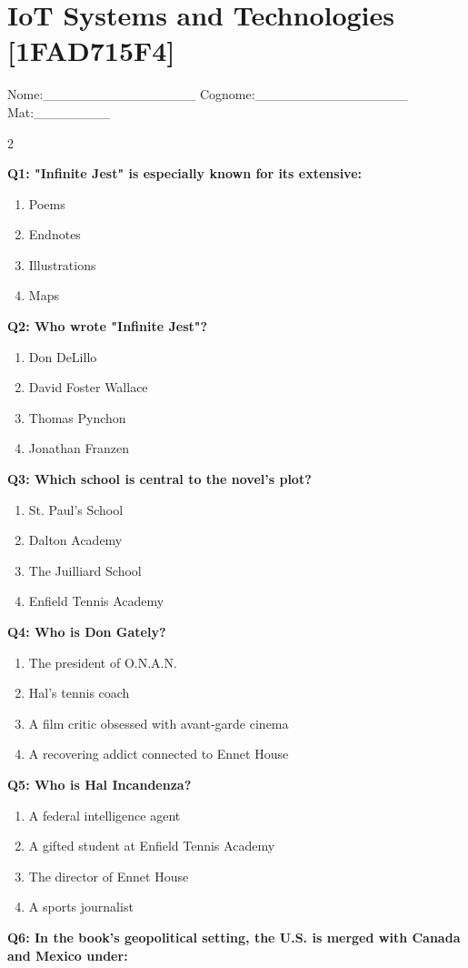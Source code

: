 \documentclass[10pt]{article}
\begin{document}
\section*{IoT Systems and Technologies \footnotesize [1FAD715F4]}
{\footnotesize Nome:\_\_\_\_\_\_\_\_\_\_\_\_\_\_\_\_ Cognome:\_\_\_\_\_\_\_\_\_\_\_\_\_\_\_\_ Mat:\_\_\_\_\_\_\_\_}
\begin{multicols}{2}

\textbf{Q1: "Infinite Jest" is especially known for its extensive:}

\begin{enumerate}[label=\arabic*.]
\item Poems
\item Endnotes
\item Illustrations
\item Maps
\end{enumerate}
\textbf{Q2: Who wrote "Infinite Jest"?}

\begin{enumerate}[label=\arabic*.]
\item Don DeLillo
\item David Foster Wallace
\item Thomas Pynchon
\item Jonathan Franzen
\end{enumerate}
\textbf{Q3: Which school is central to the novel's plot?}

\begin{enumerate}[label=\arabic*.]
\item St. Paul's School
\item Dalton Academy
\item The Juilliard School
\item Enfield Tennis Academy
\end{enumerate}
\textbf{Q4: Who is Don Gately?}

\begin{enumerate}[label=\arabic*.]
\item The president of O.N.A.N.
\item Hal's tennis coach
\item A film critic obsessed with avant-garde cinema
\item A recovering addict connected to Ennet House
\end{enumerate}
\textbf{Q5: Who is Hal Incandenza?}

\begin{enumerate}[label=\arabic*.]
\item A federal intelligence agent
\item A gifted student at Enfield Tennis Academy
\item The director of Ennet House
\item A sports journalist
\end{enumerate}
\textbf{Q6: In the book's geopolitical setting, the U.S. is merged with Canada and Mexico under:}


\end{multicols}
\end{document}
